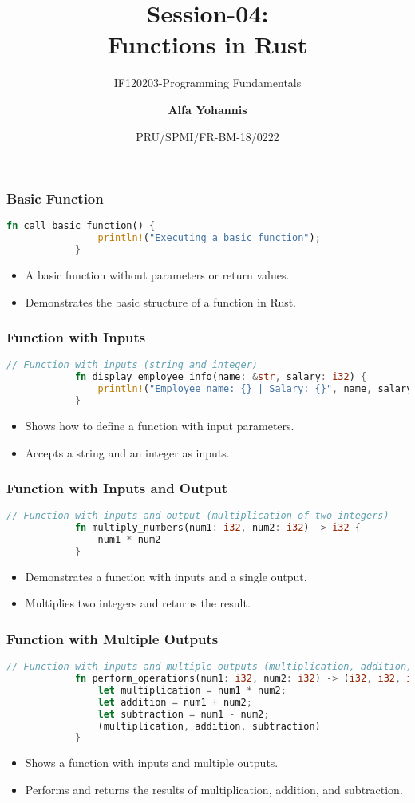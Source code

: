 \documentclass[aspectratio=169, table]{beamer}
\subtitle{IF120203-Programming Fundamentals}
\title{Session-04:\\\LARGE{
		Functions in Rust}}
\date[Serial]{\scriptsize {PRU/SPMI/FR-BM-18/0222}}
\author[Pradita]{\small{\textbf{Alfa Yohannis}}}
\begin{document}
	
	\frame{\titlepage}
	
	\begin{frame}[fragile]
		\frametitle{Basic Function}
		\begin{lstlisting}[language=Rust]
			fn call_basic_function() {
				println!("Executing a basic function");
			}
		\end{lstlisting}
		\begin{itemize}
			\item A basic function without parameters or return values.
			\item Demonstrates the basic structure of a function in Rust.
		\end{itemize}
	\end{frame}
	
	\begin{frame}[fragile]
		\frametitle{Function with Inputs}
		\begin{lstlisting}[language=Rust]
			// Function with inputs (string and integer)
			fn display_employee_info(name: &str, salary: i32) {
				println!("Employee name: {} | Salary: {}", name, salary);
			}
		\end{lstlisting}
		\begin{itemize}
			\item Shows how to define a function with input parameters.
			\item Accepts a string and an integer as inputs.
		\end{itemize}
	\end{frame}
	
	\begin{frame}[fragile]
		\frametitle{Function with Inputs and Output}
		\begin{lstlisting}[language=Rust]
			// Function with inputs and output (multiplication of two integers)
			fn multiply_numbers(num1: i32, num2: i32) -> i32 {
				num1 * num2
			}
		\end{lstlisting}
		\begin{itemize}
			\item Demonstrates a function with inputs and a single output.
			\item Multiplies two integers and returns the result.
		\end{itemize}
	\end{frame}
	
	\begin{frame}[fragile]
		\frametitle{Function with Multiple Outputs}
		\begin{lstlisting}[language=Rust]
			// Function with inputs and multiple outputs (multiplication, addition, subtraction)
			fn perform_operations(num1: i32, num2: i32) -> (i32, i32, i32) {
				let multiplication = num1 * num2;
				let addition = num1 + num2;
				let subtraction = num1 - num2;
				(multiplication, addition, subtraction)
			}
		\end{lstlisting}
		\begin{itemize}
			\item Shows a function with inputs and multiple outputs.
			\item Performs and returns the results of multiplication, addition, and subtraction.
		\end{itemize}
	\end{frame}
	
\end{document}
